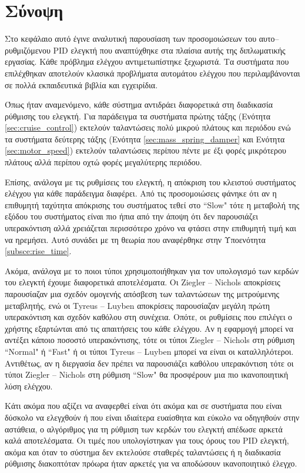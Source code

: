 \section{Σύνοψη}

Στο κεφάλαιο αυτό έγινε αναλυτική παρουσίαση των προσομοιώσεων του αυτο--ρυθμιζόμενου PID ελεγκτή που αναπτύχθηκε στα πλαίσια αυτής της διπλωματικής εργασίας. Κάθε πρόβλημα ελέγχου αντιμετωπίστηκε ξεχωριστά. Τα συστήματα που επιλέχθηκαν αποτελούν κλασικά προβλήματα αυτομάτου ελέγχου που περιλαμβάνονται σε πολλά εκπαιδευτικά βιβλία και εγχειρίδια.

Όπως ήταν αναμενόμενο, κάθε σύστημα αντιδράει διαφορετικά στη διαδικασία ρύθμισης του ελεγκτή. Για παράδειγμα τα συστήματα πρώτης τάξης (Ενότητα \ref{sec:cruise_control}) εκτελούν ταλαντώσεις πολύ μικρού πλάτους και περιόδου ενώ τα συστήματα δεύτερης τάξης (Ενότητα \ref{sec:mass_spring_damper} και Ενότητα \ref{sec:motor_speed}) εκτελούν ταλαντώσεις περίπου πέντε με έξι φορές μικρότερου πλάτους αλλά περίπου οχτώ φορές μεγαλύτερης περιόδου. 

Επίσης, ανάλογα με τις ρυθμίσεις του ελεγκτή, η απόκριση του κλειστού συστήματος ελέγχου για κάθε παράδειγμα διαφέρει. Από τις προσομοιώσεις φάνηκε ότι αν η επιθυμητή ταχύτητα απόκρισης του συστήματος τεθεί στο ``Slow" τότε η μεταβολή της εξόδου του συστήματος είναι πιο ήπια από την άποψη ότι δεν παρουσιάζει υπερακόντιση αλλά χρειάζεται περισσότερο χρόνο να φτάσει στην επιθυμητή τιμή και να ηρεμήσει. Αυτό συνάδει με τη θεωρία που αναφέρθηκε στην Υποενότητα \ref{subsce:rise_time}. 

Ακόμα, ανάλογα με το ποιοι τύποι χρησιμοποιήθηκαν για τον υπολογισμό των κερδών του ελεγκτή έχουμε διαφορετικά αποτελέσματα. Οι Ziegler -- Nichols αποκρίσεις παρουσίαζαν μια σχεδόν ομογενής απόσβεση των ταλαντώσεων της μετρούμενης μεταβλητής, ενώ οι Tyreus -- Luyben αποκρίσεις παρουσίαζαν μεγάλη πρώτη υπερακόντιση και σχεδόν καθόλου στη συνέχεια. Οπότε, οι ρυθμίσεις που επιλέγει ο χρήστης εξαρτώνται από τις απαιτήσεις του κάθε ελέγχου. Αν η εφαρμογή μπορεί να αντέξει κάποιο ποσοστό υπερακόντισης, τότε οι τύποι Ziegler -- Nichols στη ρύθμιση ``Normal" ή ``Fast" ή οι τύποι Tyreus -- Luyben μπορεί να είναι οι καταλληλότεροι. Αντιθέτως, αν η διεργασία δεν πρέπει να παρουσιάζει καθόλου υπερακόντιση τότε οι τύποι Ziegler -- Nichols στη ρύθμιση ``Slow" θα προσφέρουν μια πιο ικανοποιητική λύση ελέγχου.

Κάτι ακόμα που αξίζει να αναφερθεί είναι ότι ακόμα και σε συστήματα που είναι δύσκολο να ελεγχθούν ή που είναι ιδιαίτερα ευαίσθητα και εύκολο να οδηγηθούν στην αστάθεια, ο αλγόριθμος για τη ρύθμιση των κερδών του ελεγκτή απέδωσε αρκετά καλά αποτελέσματα. Οι τιμές που υπολογίστηκαν για τους όρους του PID ελεγκτή, ακόμα και όταν το σύστημα δεν εκτελούσε σταθερές ταλαντώσεις ή η διαδικασία ρύθμισης διακοπτόταν πρόωρα ήταν αρκετές για να αποδώσουν ικανοποιητικό έλεγχο.

